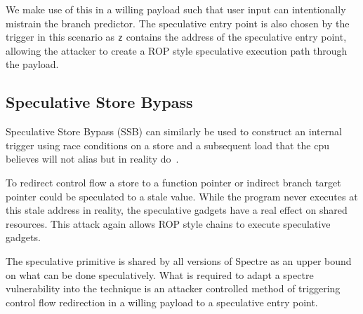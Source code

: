  

We make use of this in a willing payload such that user input can intentionally 
mistrain the branch predictor. The speculative entry point is also chosen by the 
trigger in this scenario as \texttt{z} contains the address of the 
speculative entry point, allowing the attacker to create a ROP style speculative 
execution path through the payload.


\subsection{Speculative Store Bypass}

Speculative Store Bypass (SSB) can similarly be used to construct an internal trigger
using race conditions on a store and a subsequent load that the cpu believes 
will not alias but in reality do~\cite{spec-store-bypass}.

To redirect control flow a store to a function pointer or indirect branch 
target pointer could be speculated to a stale value. While the program never 
executes at this stale address in reality, the speculative gadgets have a 
real effect on shared resources. This attack again allows ROP style 
chains to execute speculative gadgets.

The speculative primitive is shared by all versions of Spectre as an upper
bound on what can be done speculatively. What is required to adapt a spectre 
vulnerability into the \speculake technique is an attacker controlled method of 
triggering control flow redirection in a willing payload to a speculative entry point. 

%
%
%


